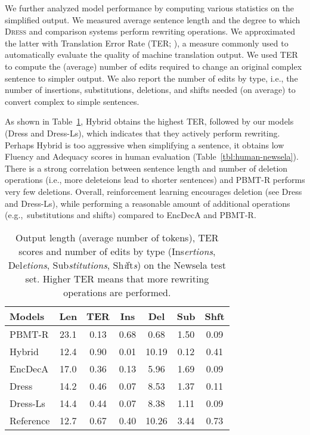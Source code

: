 \documentclass[11pt,letterpaper]{article}
\begin{document}
We further analyzed model performance by computing various statistics
on the simplified output. We measured average sentence length and the
degree to which \textsc{Dress} and comparison systems perform
rewriting operations. We approximated the latter with Translation
Error Rate (TER; \citealt{snover2006study}), a measure commonly used
to automatically evaluate the quality of machine translation
output. We used TER to compute the (average) number of edits required
to change an original complex sentence to simpler output. We also
report the number of edits by type, i.e., the number of insertions,
substitutions, deletions, and shifts needed (on average) to convert
complex to simple sentences.  

As shown in Table~\ref{tab:lenter}, Hybrid obtains the highest TER,
followed by our models ({\sc Dress} and {\sc Dress-Ls}), which
indicates that they actively perform rewriting. Perhaps Hybrid is too
aggressive when simplifying a sentence, it obtains low Fluency and
Adequacy scores in human evaluation
(Table~\ref{tbl:human-newsela}). There is a strong correlation between
sentence length and number of deletion operations (i.e., more
deleteions lead to shorter sentences) and PBMT-R performs very few
deletions. Overall, reinforcement learning encourages deletion (see
{\sc Dress} and {\sc Dress-Ls}), while performing a reasonable amount
of additional operations (e.g.,~substitutions and shifts) compared to
EncDecA and PBMT-R.


\begin{table}[t]
	\small
	\centering
	\begin{tabular}{|l | c  c  c  c  c  c|}
		\hline
		Models & Len & TER & Ins & Del & Sub & Shft \\
		\hline
		\hline
		PBMT-R & 23.1 & 0.13 & 0.68 & 0.68 & 1.50 & 0.09 \\
		Hybrid & 12.4 & 0.90 & 0.01 & 10.19 & 0.12 & 0.41 \\
		EncDecA & 17.0 & 0.36 & 0.13 & 5.96 & 1.69 & 0.09 \\
		{\sc Dress} & 14.2 &  0.46 & 0.07 & 8.53 & 1.37 & 0.11 \\
		{\sc Dress-Ls} & 14.4 &  0.44 & 0.07 & 8.38 & 1.11 & 0.09 \\
		Reference & 12.7 & 0.67 & 0.40 & 10.26 & 3.44 & 0.73 \\
		\hline
	\end{tabular}
	\caption{Output length (average number of
          tokens), TER scores and number of edits by type
          (Ins\emph{ertions}, Del\emph{etions}, Sub\emph{stitutions},
          Sh\emph{i}ft\emph{s}) on the Newsela test set. Higher TER 
          means that more rewriting operations are performed.}
	\label{tab:lenter}
\end{table}
\end{document}
